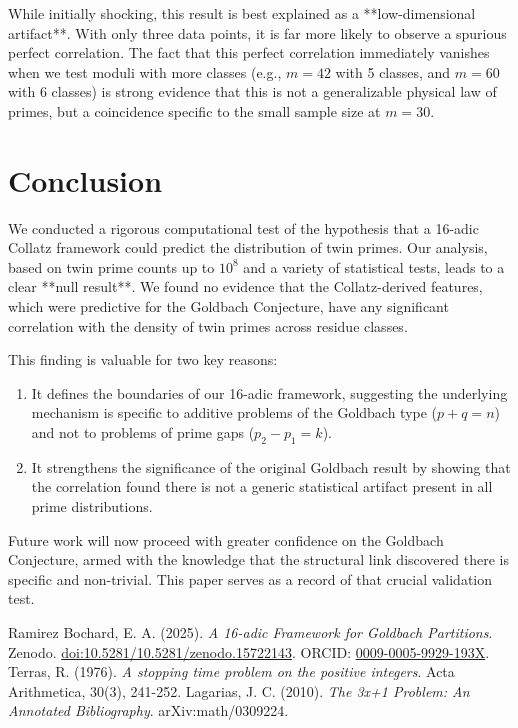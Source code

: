 \documentclass[12pt]{article}
\begin{document}
	While initially shocking, this result is best explained as a **low-dimensional artifact**. With only three data points, it is far more likely to observe a spurious perfect correlation. The fact that this perfect correlation immediately vanishes when we test moduli with more classes (e.g., $m=42$ with 5 classes, and $m=60$ with 6 classes) is strong evidence that this is not a generalizable physical law of primes, but a coincidence specific to the small sample size at $m=30$.
	
	\section{Conclusion}
	We conducted a rigorous computational test of the hypothesis that a 16-adic Collatz framework could predict the distribution of twin primes. Our analysis, based on twin prime counts up to $10^8$ and a variety of statistical tests, leads to a clear **null result**. We found no evidence that the Collatz-derived features, which were predictive for the Goldbach Conjecture, have any significant correlation with the density of twin primes across residue classes.
	
	This finding is valuable for two key reasons:
	\begin{enumerate}
		\item It defines the boundaries of our 16-adic framework, suggesting the underlying mechanism is specific to additive problems of the Goldbach type ($p+q=n$) and not to problems of prime gaps ($p_2 - p_1 = k$).
		\item It strengthens the significance of the original Goldbach result by showing that the correlation found there is not a generic statistical artifact present in all prime distributions.
	\end{enumerate}
	
	Future work will now proceed with greater confidence on the Goldbach Conjecture, armed with the knowledge that the structural link discovered there is specific and non-trivial. This paper serves as a record of that crucial validation test.
	
	\begin{thebibliography}{9}
		 Ramirez Bochard, E. A. (2025). \textit{A 16-adic Framework for Goldbach Partitions}. Zenodo. \href{https://doi.org/10.5281/zenodo.15722143}{doi:10.5281/10.5281/zenodo.15722143}. ORCID: \href{https://orcid.org/0009-0005-9929-193X}{0009-0005-9929-193X}.
		 Terras, R. (1976). \textit{A stopping time problem on the positive integers}. Acta Arithmetica, 30(3), 241-252.
		 Lagarias, J. C. (2010). \textit{The 3x+1 Problem: An Annotated Bibliography}. arXiv:math/0309224.
	\end{thebibliography}
	
\end{document}

